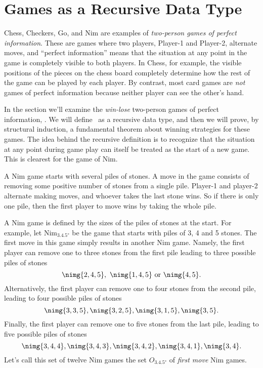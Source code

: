 \begin{definition}
\begin{problems}
\homeworkproblems
{}

\end{problems}

\section{Games as a Recursive Data Type}\label{recursive_games}
Chess, Checkers, Go, and Nim are examples of \emph{two-person games of
  perfect information}.  These are games where two players, Player-1
and Player-2, alternate moves, and ``perfect information'' means that
the situation at any point in the game is completely visible to both
players.  In Chess, for example, the visible positions of the pieces
on the chess board completely determine how the rest of the game can
be played by each player.  By contrast, most card games are \emph{not}
games of perfect information because neither player can see the
other's hand.

In the section we'll examine the \emph{win-lose} two-person games of
perfect information, \wnls.  We will define \wnls\ as a recursive data
type, and then we will prove, by structural induction, a fundamental
theorem about winning strategies for these games.  The idea behind the
recursive definition is to recognize that the situation at any point
during game play can itself be treated as the start of a new game.
This is clearest for the game of Nim.

A Nim game starts with several piles of stones.  A move in the game
consists of removing some positive number of stones from a single
pile.  Player-1 and player-2 alternate making moves, and whoever takes
the last stone wins.  So if there is only one pile, then the first
player to move wins by taking the whole pile.

A Nim game is defined by the sizes of the piles of stones at the
start.  \iffalse
For example, let $\text{Nim}_{\ang{3,4,5}}$ be the game that
starts with piles of 3, 4 and 5 stones.  The first move in this game
simply results in another Nim game.  Namely, the first player can
remove one to three stones from the first pile leading to three
possible piles of stones
\begin{equation}\label{nimplay3}
\nimg{2,4,5},\ \nimg{1,4,5}\ \text{or}\ \nimg{4,5}.
\end{equation}
Alternatively, the first player can remove one to four stones from the
second pile, leading to four possible piles of stones
\begin{equation}\label{nimplay4}
\nimg{3,3,5},\nimg{3,2,5},\nimg{3,1,5},\nimg{3,5}.
\end{equation}
Finally, the first player can remove one to five stones from the
last pile, leading to five possible piles of stones
\begin{equation}\label{nimplay5}
\nimg{3,4,4}, \nimg{3,4,3}, \nimg{3,4,2}, \nimg{3,4,1}, \nimg{3,4}.
\end{equation}
Let's call this set of twelve Nim games the set $O_{\ang{3,4,5}}$ of
\emph{first move} Nim games.


\end{definition}
